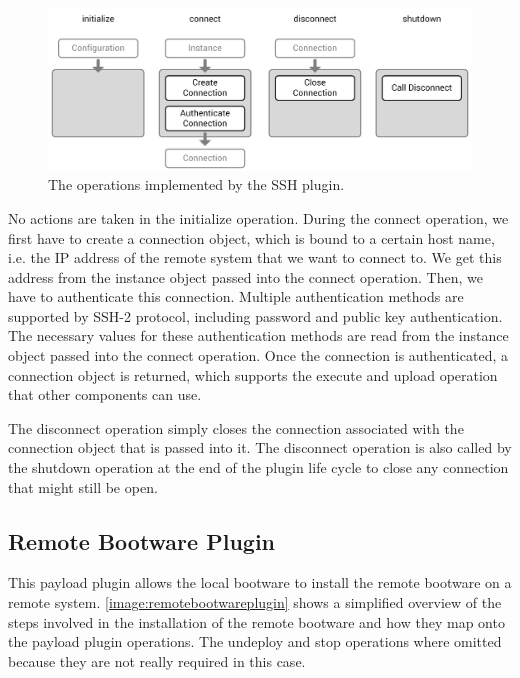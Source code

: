 \begin{figure}[!htbp]
	\centering
	\includegraphics[resolution=600]{implementation/assets/ssh_plugin}
	\caption{The operations implemented by the SSH plugin.}
	\label{image:sshplugin}
\end{figure}

No actions are taken in the initialize operation.
During the connect operation, we first have to create a connection object, which is bound to a certain host name, i.e. the IP address of the remote system that we want to connect to.
We get this address from the instance object passed into the connect operation.
Then, we have to authenticate this connection.
Multiple authentication methods are supported by SSH-2 protocol, including password and public key authentication.
The necessary values for these authentication methods are read from the instance object passed into the connect operation.
Once the connection is authenticated, a connection object is returned, which supports the execute and upload operation that other components can use.

The disconnect operation simply closes the connection associated with the connection object that is passed into it.
The disconnect operation is also called by the shutdown operation at the end of the plugin life cycle to close any connection that might still be open.

\subsection{Remote Bootware Plugin}

This payload plugin allows the local bootware to install the remote bootware on a remote system.
\autoref{image:remotebootwareplugin} shows a simplified overview of the steps involved in the installation of the remote bootware and how they map onto the payload plugin operations.
The undeploy and stop operations where omitted because they are not really required in this case.

